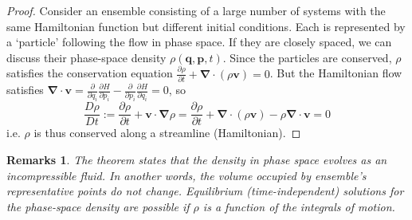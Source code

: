 \documentclass[a4paper]{article}
\newtheorem{remarks}{Remarks}[section]
\theoremstyle{new}
\begin{document}
\begin{proof}
Consider an ensemble consisting of a large number of systems with the same Hamiltonian function but different initial conditions. Each is represented by a `particle' following the flow in phase space. If they are closely spaced, we can discuss their phase-space density $\rho(\mathbf{q},\mathbf{p},t)$. Since the particles are conserved, $\rho$ satisfies the conservation equation $\frac{\partial\rho}{\partial t}+\boldsymbol{\nabla}\cdot(\rho\mathbf{v})=0$. But the Hamiltonian flow satisfies $\boldsymbol{\nabla}\cdot\mathbf{v}=\frac{\partial}{\partial q_i}\frac{\partial H}{\partial p_i}-\frac{\partial}{\partial p_i}\frac{\partial H}{\partial q_i}=0$, so
$$\frac{D\rho}{Dt}:=\frac{\partial\rho}{\partial t}+\mathbf{v}\cdot\boldsymbol{\nabla}\rho=\frac{\partial\rho}{\partial t}+\boldsymbol{\nabla}\cdot(\rho\mathbf{v})-\rho\boldsymbol{\nabla}\cdot\mathbf{v}=0$$
i.e. $\rho$ is thus conserved along a streamline (Hamiltonian).
\end{proof}
\begin{remarks}
The theorem states that the density in phase space evolves as an incompressible fluid. In another words, the volume occupied by ensemble's representative points do not change. Equilibrium (time-independent) solutions for the phase-space density are possible if $\rho$ is a function of the integrals of motion. 
\end{remarks}
\end{document}
